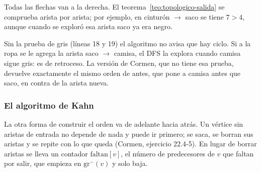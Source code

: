 \documentclass[11pt,letterpaper]{article}
\begin{document}
\begin{ejemplo}
\begin{center}
  \end{center}
  Todas las flechas van a la derecha. El
  teorema~\ref{teo:topologico-salida} se comprueba arista por arista;
  por ejemplo, en cinturón $\to$ saco se tiene $7 > 4$, aunque cuando
  se exploró esa arista saco ya era negro.
\end{ejemplo}

\begin{ojo}
  Sin la prueba de gris (líneas 18 y 19) el algoritmo no avisa que hay
  ciclo. Si a la ropa se le agrega la arista saco $\to$ camisa, el DFS
  la explora cuando camisa sigue gris: es de retroceso. La versión de
  Cormen, que no tiene esa prueba, devuelve exactamente el mismo orden
  de antes, que pone a camisa antes que saco, en contra de la arista
  nueva.
\end{ojo}

\subsubsection*{El algoritmo de Kahn}

La otra forma de construir el orden va de adelante hacia atrás. Un
vértice sin aristas de entrada no depende de nada y puede ir primero;
se saca, se borran sus aristas y se repite con lo que queda (Cormen,
ejercicio 22.4-5). En lugar de borrar aristas se lleva un contador
$\text{faltan}[v]$, el número de predecesores de $v$ que faltan por
salir, que empieza en $\text{gr}^{-}(v)$ y solo baja.
\end{document}
